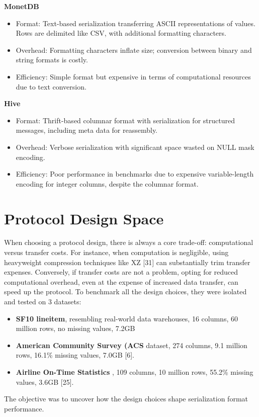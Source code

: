 \documentclass[sigconf]{acmart}
\begin{document}
\textbf{MonetDB}
\begin{itemize}
  \item Format: Text-based serialization transferring ASCII representations of values. Rows are delimited like CSV, with additional formatting characters.
  \item Overhead: Formatting characters inflate size; conversion between binary and string formats is costly.
  \item Efficiency: Simple format but expensive in terms of computational resources due to text conversion.
\end{itemize}

\textbf{Hive}
\begin{itemize}
  \item Format: Thrift-based columnar format with serialization for structured messages, including meta data for reassembly.
  \item Overhead: Verbose serialization with significant space wasted on NULL mask encoding.
  \item Efficiency: Poor performance in benchmarks due to expensive variable-length encoding for integer columns, despite the columnar format.
\end{itemize}


\section{Protocol Design Space}
When choosing a protocol design, there is always a core trade-off: computational versus transfer costs. For instance, when computation is negligible, using heavyweight compression techniques like XZ [31] can substantially trim transfer expenses. Conversely, if transfer costs are not a problem, opting for reduced computational overhead, even at the expense of increased data transfer, can speed up the protocol.
To benchmark all the design choices, they were isolated and tested on 3 datasets:
\begin{itemize}
  \item \textbf{SF10 lineitem}, resembling real-world data warehouses, 16 columns, 60 million rows, no missing values, 7.2GB
  \item \textbf{American Community Survey (ACS} dataset, 274 columns, 9.1 million rows, 16.1\% missing values, 7.0GB [6].
  \item \textbf{Airline On-Time Statistics} , 109 columns, 10 million rows, 55.2\% missing values, 3.6GB [25].
\end{itemize}
The objective was to uncover how the design choices shape serialization format performance.
\end{document}
